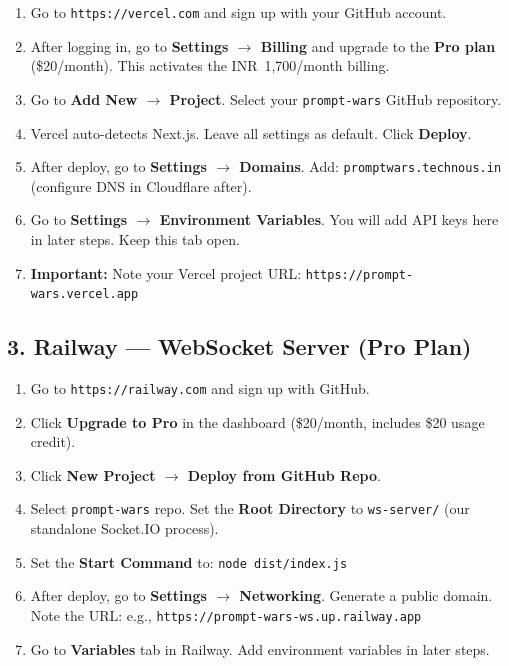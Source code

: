 \documentclass[11pt, a4paper]{article}
\begin{document}
\begin{tcolorbox}[stepbox, title={Step-by-Step: Vercel Pro Account Setup}]
\begin{enumerate}[leftmargin=1cm, itemsep=3pt]
    \item Go to \texttt{https://vercel.com} and sign up with your GitHub account.
    \item After logging in, go to \textbf{Settings $\to$ Billing} and upgrade to the \textbf{Pro plan} (\$20/month). This activates the INR~1,700/month billing.
    \item Go to \textbf{Add New $\to$ Project}. Select your \texttt{prompt-wars} GitHub repository.
    \item Vercel auto-detects Next.js. Leave all settings as default. Click \textbf{Deploy}.
    \item After deploy, go to \textbf{Settings $\to$ Domains}. Add: \texttt{promptwars.technous.in} (configure DNS in Cloudflare after).
    \item Go to \textbf{Settings $\to$ Environment Variables}. You will add API keys here in later steps. Keep this tab open.
    \item \textbf{Important:} Note your Vercel project URL: \texttt{https://prompt-wars.vercel.app}
\end{enumerate}
\end{tcolorbox}

\subsection{3. Railway --- WebSocket Server (Pro Plan)}

\begin{tcolorbox}[stepbox, title={Step-by-Step: Railway Pro Account Setup}]
\begin{enumerate}[leftmargin=1cm, itemsep=3pt]
    \item Go to \texttt{https://railway.com} and sign up with GitHub.
    \item Click \textbf{Upgrade to Pro} in the dashboard (\$20/month, includes \$20 usage credit).
    \item Click \textbf{New Project $\to$ Deploy from GitHub Repo}.
    \item Select \texttt{prompt-wars} repo. Set the \textbf{Root Directory} to \texttt{ws-server/} (our standalone Socket.IO process).
    \item Set the \textbf{Start Command} to: \texttt{node dist/index.js}
    \item After deploy, go to \textbf{Settings $\to$ Networking}. Generate a public domain. Note the URL: e.g., \texttt{https://prompt-wars-ws.up.railway.app}
    \item Go to \textbf{Variables} tab in Railway. Add environment variables in later steps.
\end{enumerate}
\end{tcolorbox}
\end{document}
